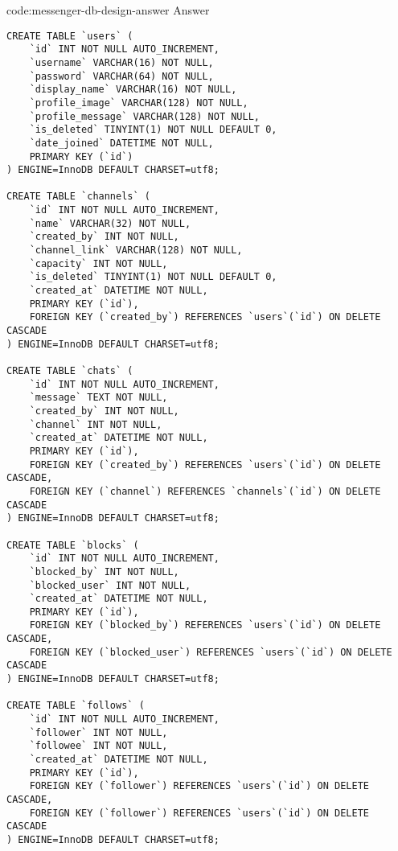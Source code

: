 \begin{codeenv}{code:messenger-db-design-answer}{ Answer}\begin{verbatim}
CREATE TABLE `users` (
    `id` INT NOT NULL AUTO_INCREMENT,
    `username` VARCHAR(16) NOT NULL,
    `password` VARCHAR(64) NOT NULL,
    `display_name` VARCHAR(16) NOT NULL,
    `profile_image` VARCHAR(128) NOT NULL,
    `profile_message` VARCHAR(128) NOT NULL,
    `is_deleted` TINYINT(1) NOT NULL DEFAULT 0,
    `date_joined` DATETIME NOT NULL,
    PRIMARY KEY (`id`)
) ENGINE=InnoDB DEFAULT CHARSET=utf8;

CREATE TABLE `channels` (
    `id` INT NOT NULL AUTO_INCREMENT,
    `name` VARCHAR(32) NOT NULL,
    `created_by` INT NOT NULL,
    `channel_link` VARCHAR(128) NOT NULL,
    `capacity` INT NOT NULL,
    `is_deleted` TINYINT(1) NOT NULL DEFAULT 0,
    `created_at` DATETIME NOT NULL,
    PRIMARY KEY (`id`),
    FOREIGN KEY (`created_by`) REFERENCES `users`(`id`) ON DELETE CASCADE
) ENGINE=InnoDB DEFAULT CHARSET=utf8;

CREATE TABLE `chats` (
    `id` INT NOT NULL AUTO_INCREMENT,
    `message` TEXT NOT NULL,
    `created_by` INT NOT NULL,
    `channel` INT NOT NULL,
    `created_at` DATETIME NOT NULL,
    PRIMARY KEY (`id`),
    FOREIGN KEY (`created_by`) REFERENCES `users`(`id`) ON DELETE CASCADE,
    FOREIGN KEY (`channel`) REFERENCES `channels`(`id`) ON DELETE CASCADE
) ENGINE=InnoDB DEFAULT CHARSET=utf8;

CREATE TABLE `blocks` (
    `id` INT NOT NULL AUTO_INCREMENT,
    `blocked_by` INT NOT NULL,
    `blocked_user` INT NOT NULL,
    `created_at` DATETIME NOT NULL,
    PRIMARY KEY (`id`),
    FOREIGN KEY (`blocked_by`) REFERENCES `users`(`id`) ON DELETE CASCADE,
    FOREIGN KEY (`blocked_user`) REFERENCES `users`(`id`) ON DELETE CASCADE
) ENGINE=InnoDB DEFAULT CHARSET=utf8;

CREATE TABLE `follows` (
    `id` INT NOT NULL AUTO_INCREMENT,
    `follower` INT NOT NULL,
    `followee` INT NOT NULL,
    `created_at` DATETIME NOT NULL,
    PRIMARY KEY (`id`),
    FOREIGN KEY (`follower`) REFERENCES `users`(`id`) ON DELETE CASCADE,
    FOREIGN KEY (`follower`) REFERENCES `users`(`id`) ON DELETE CASCADE
) ENGINE=InnoDB DEFAULT CHARSET=utf8;
\end{verbatim}
\end{codeenv}
